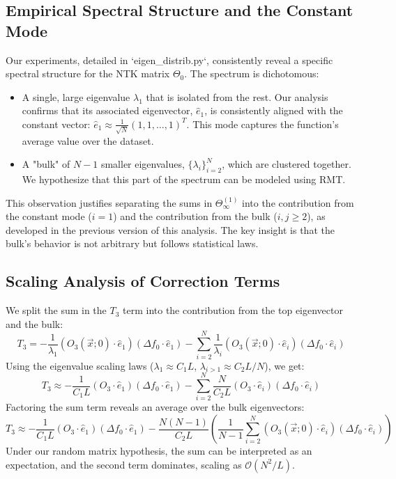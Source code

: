 \documentclass{article}
\begin{document}
\subsection{Empirical Spectral Structure and the Constant Mode}
Our experiments, detailed in `eigen_distrib.py`, consistently reveal a specific spectral structure for the NTK matrix $\Theta_0$. The spectrum is dichotomous:
\begin{itemize}
    \item A single, large eigenvalue $\lambda_1$ that is isolated from the rest. Our analysis confirms that its associated eigenvector, $\hat{e}_1$, is consistently aligned with the constant vector: $\hat{e}_1 \approx \frac{1}{\sqrt{N}}(1, 1, \dots, 1)^T$. This mode captures the function's average value over the dataset.
    \item A "bulk" of $N-1$ smaller eigenvalues, $\{\lambda_i\}_{i=2}^N$, which are clustered together. We hypothesize that this part of the spectrum can be modeled using RMT.
\end{itemize}
This observation justifies separating the sums in $\Theta^{(1)}_\infty$ into the contribution from the constant mode ($i=1$) and the contribution from the bulk ($i,j \ge 2$), as developed in the previous version of this analysis. The key insight is that the bulk's behavior is not arbitrary but follows statistical laws.

\subsection{Scaling Analysis of Correction Terms}
We split the sum in the $T_3$ term into the contribution from the top eigenvector and the bulk:
\[ T_3 = -\frac{1}{\lambda_{1}}(O_{3}(\vec{x};0)\cdot\hat{e}_{1})(\Delta f_{0}\cdot\hat{e}_{1}) - \sum_{i=2}^N\frac{1}{\lambda_{i}}(O_{3}(\vec{x};0)\cdot\hat{e}_{i})(\Delta f_{0}\cdot\hat{e}_{i}) \]
Using the eigenvalue scaling laws ($\lambda_1 \approx C_1 L$, $\lambda_{i>1} \approx C_2 L/N$), we get:
\[ T_3 \approx -\frac{1}{C_1 L}(O_{3}\cdot\hat{e}_{1})(\Delta f_{0}\cdot\hat{e}_{1}) - \sum_{i=2}^N\frac{N}{C_2 L}(O_{3}\cdot\hat{e}_{i})(\Delta f_{0}\cdot\hat{e}_{i}) \]
Factoring the sum term reveals an average over the bulk eigenvectors:
\[ T_3 \approx -\frac{1}{C_1 L}(O_{3}\cdot\hat{e}_{1})(\Delta f_{0}\cdot\hat{e}_{1}) - \frac{N(N-1)}{C_2 L} \left( \frac{1}{N-1} \sum_{i=2}^N (O_{3}(\vec{x};0)\cdot\hat{e}_{i})(\Delta f_{0}\cdot\hat{e}_{i}) \right) \]
Under our random matrix hypothesis, the sum can be interpreted as an expectation, and the second term dominates, scaling as $\mathcal{O}(N^2/L)$.
\end{document}
